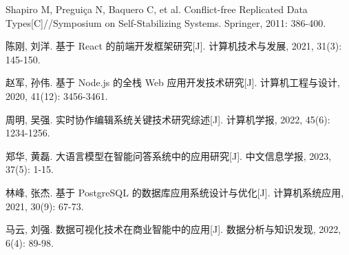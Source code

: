 \begin{enumerate}[label={[\arabic*]}, leftmargin=2em]
\item Shapiro M, Preguiça N, Baquero C, et al. Conflict-free Replicated Data Types[C]//Symposium on Self-Stabilizing Systems. Springer, 2011: 386-400.

\item 陈刚, 刘洋. 基于 React 的前端开发框架研究[J]. 计算机技术与发展, 2021, 31(3): 145-150.

\item 赵军, 孙伟. 基于 Node.js 的全栈 Web 应用开发技术研究[J]. 计算机工程与设计, 2020, 41(12): 3456-3461.

\item 周明, 吴强. 实时协作编辑系统关键技术研究综述[J]. 计算机学报, 2022, 45(6): 1234-1256.

\item 郑华, 黄磊. 大语言模型在智能问答系统中的应用研究[J]. 中文信息学报, 2023, 37(5): 1-15.

\item 林峰, 张杰. 基于 PostgreSQL 的数据库应用系统设计与优化[J]. 计算机系统应用, 2021, 30(9): 67-73.

\item 马云, 刘强. 数据可视化技术在商业智能中的应用[J]. 数据分析与知识发现, 2022, 6(4): 89-98.

\end{enumerate}
